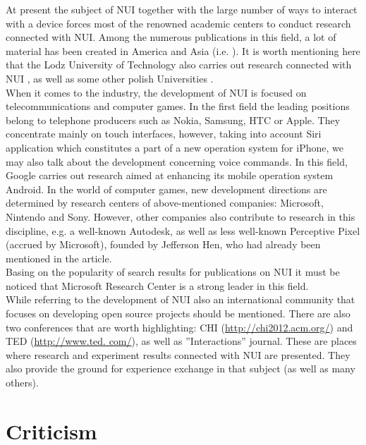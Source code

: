 \documentclass{jacsart}
\begin{document}
\indent At present the subject of NUI together with the large number of ways to interact with a device forces most of the renowned academic centers to conduct research connected with NUI. Among the numerous publications in this field, a lot of material has been created in America and Asia (i.e. \cite{Chang2011, Fang2011, Gallagher2010, Han2006, Jr2011, Lee2007, Li2000, Liu2009, Liu2010b, Norman2010, Ong2005, Sidik2011, Wang2002}). It is worth mentioning here that the Lodz University of Technology also carries out research connected with NUI \cite{Wojciechowski, krolak2008}, as well as some other polish Universities \cite{Marnik2003, Myslinski2009}.\\
\indent When it comes to the industry, the development of NUI is focused on telecommunications and computer games. In the first field the leading positions belong to telephone producers such as Nokia, Samsung, HTC or Apple. They concentrate mainly on touch interfaces, however, taking into account Siri application which constitutes a part of a new operation system for iPhone, we may also talk about the development concerning voice commands. In this field, Google carries out research aimed at enhancing its mobile operation system Android. In the world of computer games, new development directions are determined by research centers of above-mentioned companies: Microsoft, Nintendo and Sony. However, other companies also contribute to research in this discipline, e.g. a well-known Autodesk, as well as less well-known Perceptive Pixel (accrued by Microsoft), founded by Jefferson Hen, who had already been  mentioned in the article.\\
\indent Basing on the popularity of search results for publications on NUI it must be noticed that Microsoft Research Center is a strong leader in this field.\\
\indent While referring to the development of NUI also an international community that focuses on developing open source projects should be mentioned. There are also two conferences that are worth highlighting: CHI (\url{http://chi2012.acm.org/}) and TED (\url{http://www.ted. com/}),  as well as ''Interactions'' journal. These are places where research and experiment results connected with NUI are presented. They also provide the ground for experience exchange in that subject (as well as many others).\\

\section{Criticism} \label{sec:criticism}
\end{document}

